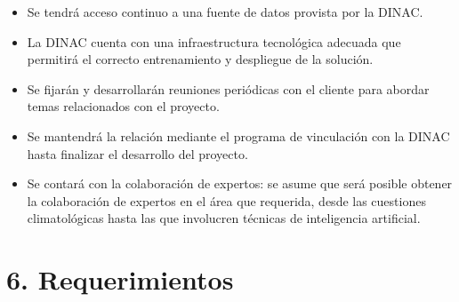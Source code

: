 \documentclass[
11pt, %
codirector, %
]{charter}
\begin{document}
\begin{itemize}
	\item Se tendrá acceso continuo a una fuente de datos provista por la DINAC.
	\item La DINAC cuenta con una infraestructura tecnológica adecuada que permitirá el correcto entrenamiento y despliegue de la solución.
	\item Se fijarán y desarrollarán reuniones periódicas con el cliente para abordar temas relacionados con el proyecto.
	\item Se mantendrá la relación mediante el programa de vinculación con la DINAC hasta finalizar el desarrollo del proyecto.
	\item Se contará con la colaboración de expertos: se asume que será posible obtener la colaboración de expertos en el área que requerida, desde las cuestiones climatológicas hasta las que involucren técnicas de inteligencia artificial.
\end{itemize}

\section{6. Requerimientos}
\label{sec:requerimientos}
\end{document}
